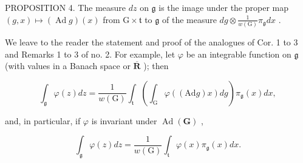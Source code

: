 PROPOSITION 4. The measure \(dz\) on \(\mathfrak{g}\) is the image under the proper map \((g,x)\mapsto (\operatorname {Ad}g)(x)\) from \(\mathrm{G}\times \mathfrak{t}\) to \(\mathfrak{g}\) of the measure \(dg\otimes \frac{1}{w(\mathrm{G})}\pi_{\mathfrak{g}}dx\) .

We leave to the reader the statement and proof of the analogues of Cor. 1 to 3 and Remarks 1 to 3 of no. 2. For example, let \(\varphi\) be an integrable function on \(\mathfrak{g}\) (with values in a Banach space or \(\overline{\mathbf{R}}\) ); then

\[
\int_ {\mathfrak {g}} \varphi (z) d z = \frac {1}{w (\mathrm{G})} \int_ {\mathfrak {t}} \left(\int_ {\mathrm{G}} \varphi ((\mathrm{Ad} g) x) d g\right) \pi_ {\mathfrak {g}} (x) d x,\tag{12}
\]

and, in particular, if \(\varphi\) is invariant under \(\operatorname{Ad}(\mathbf{G})\) ,

\[
\int_ {\mathfrak {g}} \varphi (z) d z = \frac {1}{w (\mathrm{G})} \int_ {\mathfrak {t}} \varphi (x) \pi_ {\mathfrak {g}} (x) d x.\tag{13}
\]

